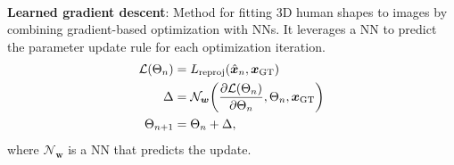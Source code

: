 \documentclass{article}
\newcommand{\lft}{\mathopen{}\mathclose\bgroup\left}
\newcommand{\rgt}{\aftergroup\egroup\right}
\renewcommand{\vec}[1]{\bm{#1}}
\newenvironment{topic}[1]
{\textbf{\sffamily \colorbox{black}{\rlap{\textbf{\textcolor{white}{#1}}}\hspace{\linewidth}\hspace{-2\fboxsep}}} \\ \vspace{0.2cm}}
{}
\begin{document}
\begin{multicols*}{2}
\begin{topic}{Parametric human body models}
        \textbf{Learned gradient descent}: Method for fitting 3D human shapes to images by combining
        gradient-based optimization with NNs. It leverages a NN to predict
        the parameter update rule for each optimization iteration.
        \begin{align*}
            \mathcal{L}(\Theta_n) & = L_{\mathrm{reproj}}(\hat{\vec{x}}_n, \vec{x}_{\mathrm{GT}})                                             \\
            \Delta                & = \mathcal{N}_{\vec{w}}\lft( \pdv{\mathcal{L}(\Theta_n)}{\Theta_n}, \Theta_n, \vec{x}_{\mathrm{GT}} \rgt) \\
            \Theta_{n+1}          & = \Theta_n + \Delta,
        \end{align*}
        where $\mathcal{N}_{\vec{w}}$ is a NN that predicts the update.
    \end{topic}

\end{multicols*}
\end{document}
